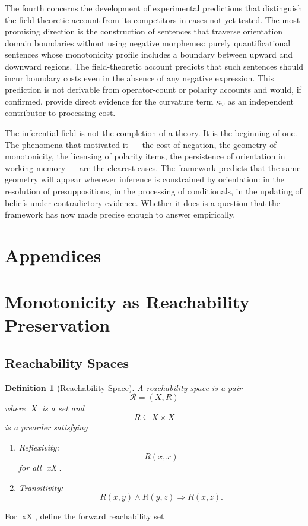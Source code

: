 \documentclass[12pt]{article}
\newtheorem{definition}[theorem]{Definition}
\theoremstyle{remark}
\begin{document}
The fourth concerns the development of experimental predictions that
distinguish the field-theoretic account from its competitors in cases
not yet tested. The most promising direction is the construction of
sentences that traverse orientation domain boundaries without using
negative morphemes: purely quantificational sentences whose monotonicity
profile includes a boundary between upward and downward regions. The
field-theoretic account predicts that such sentences should incur
boundary costs even in the absence of any negative expression. This
prediction is not derivable from operator-count or polarity accounts and
would, if confirmed, provide direct evidence for the curvature term
$\kappa_\omega$ as an independent contributor to processing cost.

The inferential field is not the completion of a theory. It is the
beginning of one. The phenomena that motivated it --- the cost of
negation, the geometry of monotonicity, the licensing of polarity items,
the persistence of orientation in working memory --- are the clearest
cases. The framework predicts that the same geometry will appear wherever
inference is constrained by orientation: in the resolution of
presuppositions, in the processing of conditionals, in the updating of
beliefs under contradictory evidence. Whether it does is a question that
the framework has now made precise enough to answer empirically.


\newpage 
\section*{Appendices}

\appendix

\section{Monotonicity as Reachability Preservation}

\subsection{Reachability Spaces}

\begin{definition}[Reachability Space]
A \emph{reachability space} is a pair
\[
\mathcal{R}=(X,R)
\]
where X is a set and
\[
R\subseteq X\times X
\]
is a preorder satisfying
\begin{enumerate}
\item Reflexivity:
\[
R(x,x)
\]
for all x\in X.
\item Transitivity:
\[
R(x,y)\wedge R(y,z)
\Rightarrow
R(x,z).
\]
\end{enumerate}
\end{definition}
For x\in X, define the forward reachability set
\end{document}
